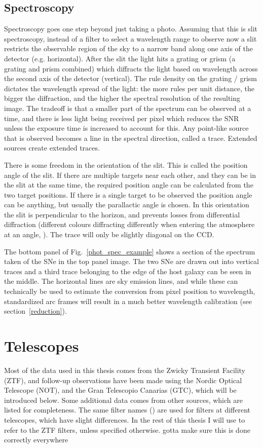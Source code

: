 \documentclass[a4paper,oneside,12pt, class=Latex/Classes/PhDthesisPSnPDF, crop=false]{standalone}
\begin{document}
\subsection{Spectroscopy}
Spectroscopy goes one step beyond just taking a photo. Assuming that this is slit spectroscopy, instead of a filter to select a wavelength range to observe now a slit restricts the observable region of the sky to a narrow band along one axis of the detector (e.g. horizontal). After the slit the light hits a grating or grism (a grating and prism combined) which diffracts the light based on wavelength across the second axis of the detector (vertical). The rule density on the grating / grism dictates the wavelength spread of the light: the more rules per unit distance, the bigger the diffraction, and the higher the spectral resolution of the resulting image. The tradeoff is that a smaller part of the spectrum can be observed at a time, and there is less light being received per pixel which reduces the SNR unless the exposure time is increased to account for this. Any point-like source that is observed becomes a line in the spectral direction, called a trace. Extended sources create extended traces.

There is some freedom in the orientation of the slit. This is called the position angle of the slit. If there are multiple targets near each other, and they can be in the slit at the same time, the required position angle can be calculated from the two target positions. If there is a single target to be observed the position angle can be anything, but usually the parallactic angle is chosen. In this orientation the slit is perpendicular to the horizon, and prevents losses from differential diffraction (different colours diffracting differently when entering the atmosphere at an angle, \citealt{diff_refrac_atmosphere}). The trace will only be slightly diagonal on the CCD.

The bottom panel of Fig.~\ref{phot_spec_example} shows a section of the spectrum taken of the SNe in the top panel image. The two SNe are drawn out into vertical traces and a third trace belonging to the edge of the host galaxy can be seen in the middle. The horizontal lines are sky emission lines, and while these can technically be used to estimate the conversion from pixel position to wavelength, standardized arc frames will result in a much better wavelength calibration (see section~\ref{reduction}).


\section{Telescopes}
\label{telescopes}
Most of the data used in this thesis comes from the Zwicky Transient Facility (ZTF), and follow-up observations have been made using the Nordic Optical Telescope (NOT), and the Gran Telescopio Canarias (GTC), which will be introduced below. Some additional data comes from other sources, which are listed for completeness. The same filter names (\ztfg\ztfr\ztfi) are used for filters at different telescopes,  which have slight differences. In the rest of this thesis I will use \ztfg\ztfr\ztfi to refer to the ZTF filters, unless specified otherwise. \color{red} gotta make sure this is done correctly everywhere \color{black}
\end{document}
